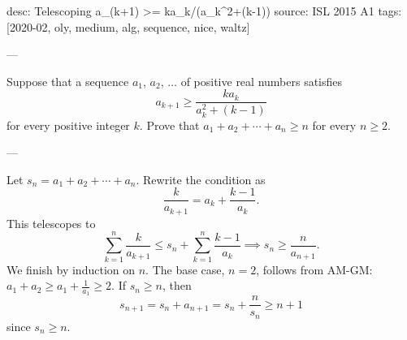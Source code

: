 desc: Telescoping a_(k+1) >= ka_k/(a_k^2+(k-1))
source: ISL 2015 A1
tags: [2020-02, oly, medium, alg, sequence, nice, waltz]

---

Suppose that a sequence $a_1$, $a_2$, $\ldots$ of positive real numbers satisfies \[a_{k+1}\ge\frac{ka_k}{a_k^2+(k-1)}\]
for every positive integer $k$. Prove that $a_1+a_2+\cdots+a_n\ge n$ for every $n\ge2$.

---

Let $s_n=a_1+a_2+\cdots+a_n$. Rewrite the condition as \[\frac k{a_{k+1}}=a_k+\frac{k-1}{a_k}.\]
This telescopes to \[\sum_{k=1}^n\frac k{a_{k+1}}\le s_n+\sum_{k=1}^n\frac{k-1}{a_k}\implies s_n\ge\frac n{a_{n+1}}.\]
We finish by induction on $n$. The base case, $n=2$, follows from AM-GM: $a_1+a_2\ge a_1+\tfrac1{a_1}\ge2$. If $s_n\ge n$, then \[s_{n+1}=s_n+a_{n+1}=s_n+\frac n{s_n}\ge n+1\]
since $s_n\ge n$.
